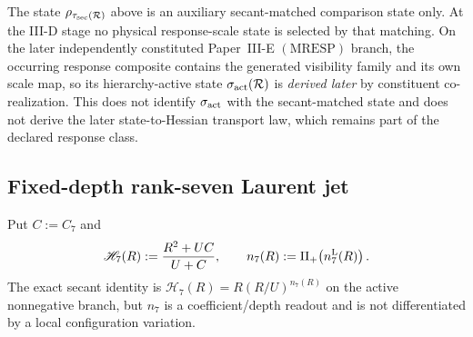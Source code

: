 \documentclass[12pt,a4paper]{article}
\begin{document}
\begin{remark}
\label{p3d:rem:mresp-derived-later-state}
The state \(\rho_{\tau_{\rm sec}(\mathcal R)}\) above is an auxiliary
secant-matched comparison state only.  At the III-D stage no physical
response-scale state is selected by that matching.  On the later independently
constituted Paper~III-E \((\mathrm{MRESP})\) branch, the occurring response
composite contains the generated visibility family and its own scale map, so
its hierarchy-active state \(\sigma_{\rm act}(\mathcal R)\) is
\emph{derived later} by constituent co-realization.  This does not identify
\(\sigma_{\rm act}\) with the secant-matched state and does not derive the
later state-to-Hessian transport law, which remains part of the declared
response class.
\end{remark}


\subsection{Fixed-depth rank-seven Laurent jet}
\label{p3d:sec:v173-n7-local-jet}
Put $C:=C_7$ and
\[
 \mathscr H_7(R):=\frac{R^2+UC}{U+C},\qquad
 n_7(R):=\Pi_+\!\left(n_7^{\rm L}(R)\right).
\]
The exact secant identity is
$\mathscr H_7(R)=R(R/U)^{n_7(R)}$ on the active nonnegative branch, but
$n_7$ is a coefficient/depth readout and is not differentiated by a local
configuration variation.
\end{document}
